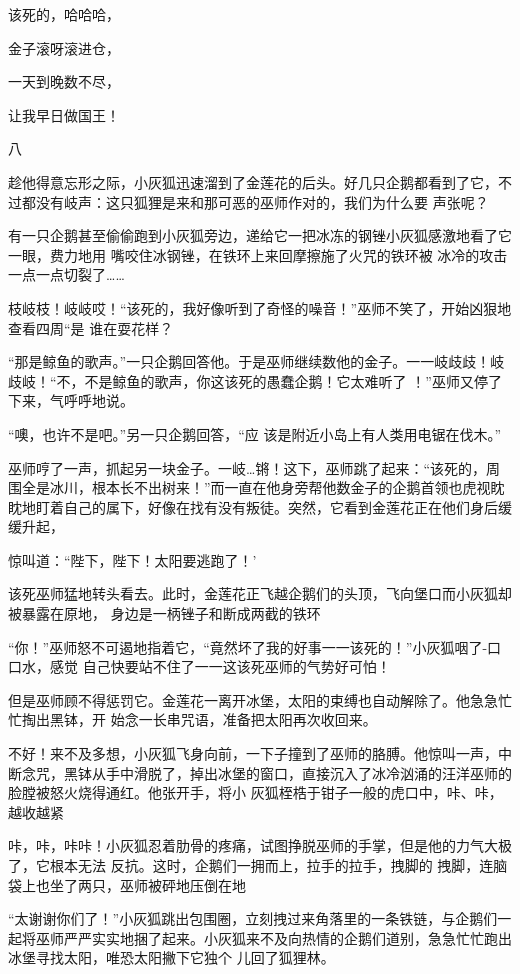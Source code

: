 \documentclass{article}
\begin{document}
该死的，哈哈哈， 


金子滚呀滚进仓， 


一天到晚数不尽， 


让我早日做国王！ 


八 

趁他得意忘形之际，小灰狐迅速溜到了金莲花的后头。好几只企鹅都看到了它，不过都没有岐声：这只狐狸是来和那可恶的巫师作对的，我们为什么要
声张呢？ 

有一只企鹅甚至偷偷跑到小灰狐旁边，递给它一把冰冻的钢锉小灰狐感激地看了它一眼，费力地用
\newpage
嘴咬住冰钢锉，在铁环上来回摩擦施了火咒的铁环被
冰冷的攻击一点一点切裂了…… 

枝岐枝！岐岐哎！“该死的，我好像听到了奇怪的噪音！”巫师不笑了，开始凶狠地查看四周“是
谁在耍花样？ 

“那是鲸鱼的歌声。”一只企鹅回答他。于是巫师继续数他的金子。一一岐歧歧！岐歧岐！“不，不是鲸鱼的歌声，你这该死的愚蠢企鹅！它太难听了
！”巫师又停了下来，气呼呼地说。 

“噢，也许不是吧。”另一只企鹅回答，“应
该是附近小岛上有人类用电锯在伐木。” 

巫师哼了一声，抓起另一块金子。一岐…锵！这下，巫师跳了起来：“该死的，周围全是冰川，根本长不出树来！”而一直在他身旁帮他数金子的企鹅首领也虎视眈眈地盯着自己的属下，好像在找有没有叛徒。突然，它看到金莲花正在他们身后缓缓升起，

\newpage
惊叫道：“陛下，陛下！太阳要逃跑了！’ 

该死巫师猛地转头看去。此时，金莲花正飞越企鹅们的头顶，飞向堡口而小灰狐却被暴露在原地，
身边是一柄锉子和断成两截的铁环 

“你！”巫师怒不可遏地指着它，“竟然坏了我的好事一一该死的！”小灰狐咽了-口口水，感觉
自己快要站不住了一一这该死巫师的气势好可怕！ 

但是巫师顾不得惩罚它。金莲花一离开冰堡，太阳的束缚也自动解除了。他急急忙忙掏出黑钵，开
始念一长串咒语，准备把太阳再次收回来。 

不好！来不及多想，小灰狐飞身向前，一下子撞到了巫师的胳膊。他惊叫一声，中断念咒，黑钵从手中滑脱了，掉出冰堡的窗口，直接沉入了冰冷汹涌的汪洋巫师的脸膛被怒火烧得通红。他张开手，将小
灰狐桎梏于钳子一般的虎口中，咔、咔，越收越紧 

咔，咔，咔咔！小灰狐忍着肋骨的疼痛，试图挣脱巫师的手掌，但是他的力气大极了，它根本无法
\newpage
反抗。这时，企鹅们一拥而上，拉手的拉手，拽脚的
拽脚，连脑袋上也坐了两只，巫师被砰地压倒在地 

“太谢谢你们了！”小灰狐跳出包围圈，立刻拽过来角落里的一条铁链，与企鹅们一起将巫师严严实实地捆了起来。小灰狐来不及向热情的企鹅们道别，急急忙忙跑出冰堡寻找太阳，唯恐太阳撇下它独个
儿回了狐狸林。 
\end{document}

